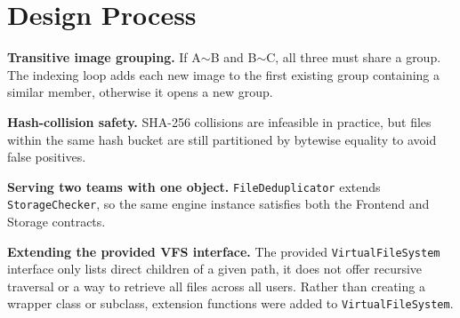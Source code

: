 \section{Design Process}

\textbf{Transitive image grouping.}
If A$\sim$B and B$\sim$C, all three must share a group.
The indexing loop adds each new image to the first existing group containing a similar member,
otherwise it opens a new group.

\textbf{Hash-collision safety.}
SHA-256 collisions are infeasible in practice,
but files within the same hash bucket are still partitioned by bytewise equality to avoid false positives.

\textbf{Serving two teams with one object.}
\texttt{FileDeduplicator} extends \texttt{StorageChecker},
so the same engine instance satisfies both the Frontend and Storage contracts.

\textbf{Extending the provided VFS interface.}
The provided \texttt{VirtualFileSystem} interface only lists direct children of a given path,
it does not offer recursive traversal or a way to retrieve all files across all users.
Rather than creating a wrapper class or subclass, extension functions were added to \texttt{VirtualFileSystem}.
